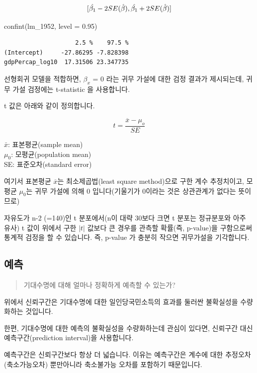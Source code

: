 \documentclass[
  letterpaper,
  DIV=11,
  numbers=noendperiod]{scrartcl}
\newenvironment{Shaded}{\begin{snugshade}}{\end{snugshade}}
\newcommand{\AttributeTok}[1]{\textcolor[rgb]{0.40,0.45,0.13}{#1}}
\newcommand{\FloatTok}[1]{\textcolor[rgb]{0.68,0.00,0.00}{#1}}
\newcommand{\FunctionTok}[1]{\textcolor[rgb]{0.28,0.35,0.67}{#1}}
\newcommand{\NormalTok}[1]{\textcolor[rgb]{0.00,0.23,0.31}{#1}}
\begin{document}
\[[\hat{\beta_1}-2SE(\hat{\beta}), \space \hat{\beta_1}+2SE(\hat{\beta})]\]

\begin{Shaded}
\begin{Highlighting}[]
\FunctionTok{confint}\NormalTok{(lm\_1952, }\AttributeTok{level =} \FloatTok{0.95}\NormalTok{)}
\end{Highlighting}
\end{Shaded}

\begin{verbatim}
                    2.5 %    97.5 %
(Intercept)     -27.86295 -7.828398
gdpPercap_log10  17.31506 23.347735
\end{verbatim}

선형회귀 모델을 적합하면, \(\beta_x\) = 0 라는 귀무 가설에 대한 검정
결과가 제시되는데, 귀무 가설 검정에는 t-statistic 을 사용합니다.

t 값은 아래와 같이 정의합니다.

\[t=\frac{\overline{x}-\mu_o}{SE}\]

\(\bar{x}\): 표본평균(sample mean)\\
\(\mu_0\): 모평균(population mean)\\
SE: 표준오차(standard error)

여기서 표본평균 \(\overline{x}\)는 최소제곱법(least square method)으로
구한 계수 추정치이고, 모평균 \(\mu_0\)는 귀무 가설에 의해 0
입니다(기울기가 0이라는 것은 상관관계가 없다는 뜻이므로)

자유도가 n-2 (=140)인 t 분포에서(n이 대략 30보다 크면 t 분포는
정규분포와 아주 유사) t 값이 위에서 구한 \(|t|\) 값보다 큰 경우를 관측할
확률(즉, p-value)을 구함으로써 통계적 검정을 할 수 있습니다. 즉, p-value
가 충분히 작으면 귀무가설을 기각합니다.

\hypertarget{uxc608uxce21}{%
\subsection{예측}\label{uxc608uxce21}}

\begin{quote}
기대수명에 대해 얼마나 정확하게 예측할 수 있는가?
\end{quote}

위에서 신뢰구간은 기대수명에 대한 일인당국민소득의 효과를 둘러싼
불확실성을 수량화하는 것입니다.

한편, 기대수명에 대한 예측의 불확실성을 수량화하는데 관심이 있다면,
신뢰구간 대신 예측구간(prediction interval)을 사용합니다.

예측구간은 신뢰구간보다 항상 더 넓습니다. 이유는 예측구간은 계수에 대한
추정오차(축소가능오차) 뿐만아니라 축소불가능 오차를 포함하기 때문입니다.
\end{document}
